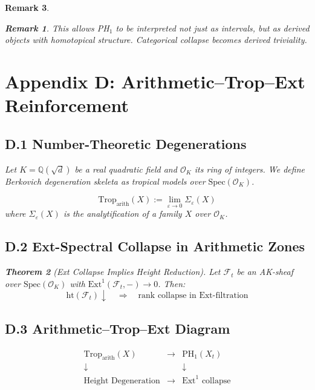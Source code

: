 \documentclass[11pt]{article}
\newtheorem{theorem}{Theorem}[section]
\newtheorem{remark}[theorem]{Remark}
\begin{document}
\begin{remark}
\begin{remark}
This allows PH$_1$ to be interpreted not just as intervals, but as derived objects with homotopical structure. Categorical collapse becomes derived triviality.
\end{remark}




\section*{Appendix D: Arithmetic–Trop–Ext Reinforcement}

\subsection*{D.1 Number-Theoretic Degenerations}

Let $K = \mathbb{Q}(\sqrt{d})$ be a real quadratic field and $\mathcal{O}_K$ its ring of integers.  
We define Berkovich degeneration skeleta as tropical models over $\mathrm{Spec}(\mathcal{O}_K)$.

\[
\mathrm{Trop}_{\text{arith}}(X) := \lim_{\varepsilon \to 0} \Sigma_\varepsilon(X)
\]
where $\Sigma_\varepsilon(X)$ is the analytification of a family $X$ over $\mathcal{O}_K$.

\subsection*{D.2 Ext-Spectral Collapse in Arithmetic Zones}

\begin{theorem}[Ext Collapse Implies Height Reduction]
Let $\mathcal{F}_t$ be an AK-sheaf over $\mathrm{Spec}(\mathcal{O}_K)$  
with $\mathrm{Ext}^1(\mathcal{F}_t, -) \to 0$. Then:
\[
\text{ht}(\mathcal{F}_t) \downarrow \quad \Rightarrow \quad \text{rank collapse in Ext-filtration}
\]
\end{theorem}

\subsection*{D.3 Arithmetic–Trop–Ext Diagram}

\[
\begin{array}{ccc}
\text{Trop}_\mathrm{arith}(X) & \longrightarrow & \mathrm{PH}_1(X_t) \\
\downarrow &                    & \downarrow \\
\text{Height Degeneration} & \longrightarrow & \mathrm{Ext}^1 \text{ collapse}
\end{array}
\]


\end{remark}
\end{document}
